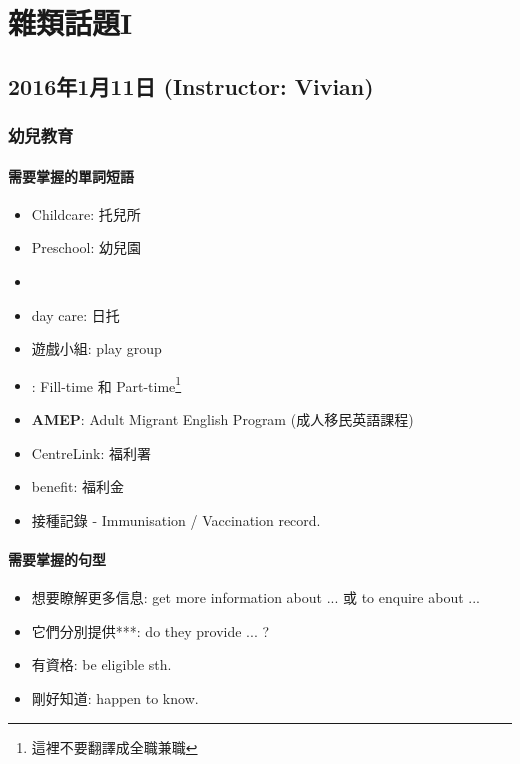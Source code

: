 \chapter{雜類話題I}
\section{2016年1月11日 (Instructor: Vivian)}
\subsection{幼兒教育}
\subsubsection*{需要掌握的單詞短語}
\begin{multicols}{2}
\begin{itemize}
  \itemsep0em
  \item Childcare: 托兒所
  \item Preschool: 幼兒園
  \item {}
  \item day care: 日托
  \item 遊戲小組: play group
  \item {}: Fill-time 和 Part-time\footnote{這裡不要翻譯成全職兼職}
  \item \textbf{AMEP}: Adult Migrant English Program (成人移民英語課程)
  \item CentreLink: 福利署
  \item benefit: 福利金
  \item 接種記錄 - Immunisation / Vaccination record.
\end{itemize}
\end{multicols}

\subsubsection*{需要掌握的句型}
\begin{itemize}
  \itemsep0em
  \item 想要瞭解更多信息: get more information about ... 或 to enquire about ...
  \item 它們分別提供***: do they  provide ... ?
  \item 有資格: be eligible  sth.
  \item 剛好知道: happen to know.
\end{itemize}

